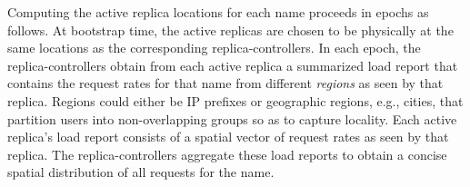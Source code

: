 



%

Computing the active replica locations for each name proceeds in epochs as follows. At bootstrap time, the active replicas are chosen to be physically at the same locations as the corresponding replica-controllers. In each epoch, the replica-controllers obtain from each active replica a summarized load report that contains the request rates for that name from different {\em regions} as seen by that replica. Regions could either be IP prefixes or geographic regions, e.g., cities, that partition users into non-overlapping groups so as to capture locality. Each active replica's load report consists of a spatial vector of request rates as seen by that replica. The replica-controllers aggregate these load reports to obtain a concise spatial distribution of all requests for the name.




\vsp
